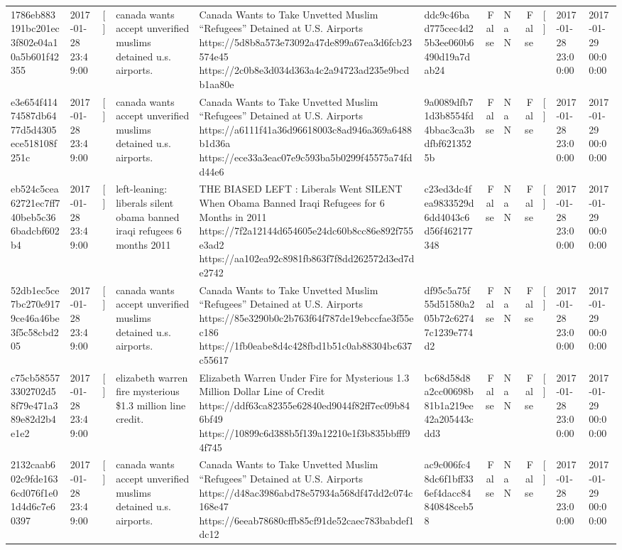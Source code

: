 \begin{tabular}{llllllrlrlll}
1786eb883191bc201ec3f802e04a10a5b601f42355 & 2017-01-28 23:49:00 & [] & canada wants accept unverified muslims detained u.s. airports. & Canada Wants to Take Unvetted Muslim “Refugees” Detained at U.S. Airports https://5d8b8a573e73092a47de899a67ea3d6fcb23574e45 https://2c0b8e3d034d363a4c2a94723ad235e9bcdb1aa80e & ddc9c46bad775cec4d25b3ee060b6490d19a7dab24 & False & NaN & False & [] & 2017-01-28 23:00:00 & 2017-01-29 00:00:00 \\
e3e654f41474587db6477d5d4305ece518108f251c & 2017-01-28 23:49:00 & [] & canada wants accept unverified muslims detained u.s. airports. & Canada Wants to Take Unvetted Muslim “Refugees” Detained at U.S. Airports https://a6111f41a36d96618003c8ad946a369a6488b1d36a https://ece33a3eac07e9c593ba5b0299f45575a74fdd44e6 & 9a0089dfb71d3b8554fd4bbac3ca3bdfbf6213525b & False & NaN & False & [] & 2017-01-28 23:00:00 & 2017-01-29 00:00:00 \\
eb524c5cea62721ec7ff740beb5c366badcbf602b4 & 2017-01-28 23:49:00 & [] & left-leaning: liberals silent obama banned iraqi refugees 6 months 2011 & THE BIASED LEFT : Liberals Went SILENT When Obama Banned Iraqi Refugees for 6 Months in 2011 https://7f2a12144d654605e24dc60b8cc86e892f755e3ad2 https://aa102ea92c8981fb863f7f8dd262572d3ed7de2742 & c23ed3dc4fea9833529d6dd4043c6d56f462177348 & False & NaN & False & [] & 2017-01-28 23:00:00 & 2017-01-29 00:00:00 \\
52db1ec5ce7bc270e9179ce46a46be3f5c58cbd205 & 2017-01-28 23:49:00 & [] & canada wants accept unverified muslims detained u.s. airports. & Canada Wants to Take Unvetted Muslim “Refugees” Detained at U.S. Airports https://85e3290b0c2b763f64f787de19ebccfae3f55ec186 https://1fb0eabe8d4c428fbd1b51c0ab88304bc637c55617 & df95c5a75f55d51580a205b72c62747c1239e774d2 & False & NaN & False & [] & 2017-01-28 23:00:00 & 2017-01-29 00:00:00 \\
c75cb585573302702d58f79e471a389e82d2b4e1e2 & 2017-01-28 23:49:00 & [] & elizabeth warren fire mysterious \$1.3 million line credit. & Elizabeth Warren Under Fire for Mysterious 1.3 Million Dollar Line of Credit https://ddf63ca82355e62840ed9044f82ff7ec09b846bf49 https://10899c6d388b5f139a12210e1f3b835bbfff94f745 & bc68d58d8a2cc00698b81b1a219ee42a205443cdd3 & False & NaN & False & [] & 2017-01-28 23:00:00 & 2017-01-29 00:00:00 \\
2132caab602c9fde1636cd076f1e01d4d6c7e60397 & 2017-01-28 23:49:00 & [] & canada wants accept unverified muslims detained u.s. airports. & Canada Wants to Take Unvetted Muslim “Refugees” Detained at U.S. Airports https://d48ac3986abd78e57934a568df47dd2c074c168e47 https://6eeab78680cffb85cf91de52caec783babdef1dc12 & ac9c006fc48dc6f1bff336ef4dacc84840848ceb58 & False & NaN & False & [] & 2017-01-28 23:00:00 & 2017-01-29 00:00:00 \\

\end{tabular}

